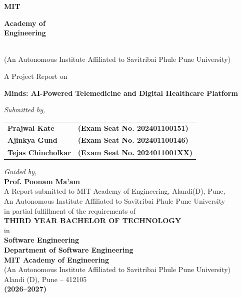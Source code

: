 \documentclass[12pt,a4paper]{report}
\begin{document}
\begin{titlepage}
\centering
\vspace*{0.2cm}

\begin{center}
    {\Huge \textbf{MIT}} \quad \vline \quad 
    \parbox[c]{4.2cm}{\large \textbf{Academy of}\\\large \textbf{Engineering}}
    \\[0.2cm]
    {\footnotesize (An Autonomous Institute Affiliated to Savitribai Phule Pune University)}
\end{center}

\vspace{0.8cm}
{\large A Project Report on}\\[0.4cm]
{\LARGE \textbf{Minds: AI-Powered Telemedicine and Digital Healthcare Platform}\par}

\vspace{0.9cm}
{\large \textit{Submitted by,}}\\[0.35cm]

\begin{tabular}{p{6.8cm} p{6.8cm}}
    \textbf{Prajwal Kate} & \textbf{(Exam Seat No. 202401100151)} \\
    \textbf{Ajinkya Gund} & \textbf{(Exam Seat No. 202401100146)} \\
    \textbf{Tejas Chincholkar} & \textbf{(Exam Seat No. 2024011001XX)} \\
\end{tabular}

\vspace{0.9cm}
{\large \textit{Guided by,}}\\[0.3cm]
{\large \textbf{Prof. Poonam Ma'am}}\\[0.9cm]

{\normalsize A Report submitted to MIT Academy of Engineering, Alandi(D), Pune,\\
An Autonomous Institute Affiliated to Savitribai Phule Pune University\\
in partial fulfillment of the requirements of}\\[0.4cm]

{\large \textbf{THIRD YEAR BACHELOR OF TECHNOLOGY}}\\[0.2cm]
in\\
\textbf{Software Engineering}\\[0.8cm]

{\large \textbf{Department of Software Engineering}}\\
{\large \textbf{MIT Academy of Engineering}}\\
{\small (An Autonomous Institute Affiliated to Savitribai Phule Pune University)}\\
Alandi (D), Pune -- 412105\\[0.4cm]
\textbf{(2026--2027)}

\end{titlepage}
\end{document}
